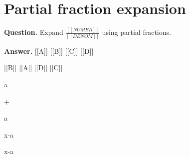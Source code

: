 \documentclass{article}
\begin{document}
\section*{Partial fraction expansion}
\textbf{Question.} Expand
                $\frac{[[NUMER]]}{[[DENOM]]}$
                using partial fractions.

\textbf{Answer.} [[A]]
                    [[B]]
                    [[C]]
                    [[D]]
                
                
                    [[B]]
                    [[A]]
                    [[D]]
                    [[C]]
                
                
                    
                        
                            
                                
                                    a
                                
                                
                                    +
                                
                                
                                    a
                                
                            
                            
                                
                                    x-a
                                
                                
                                    x-a
\end{document}
